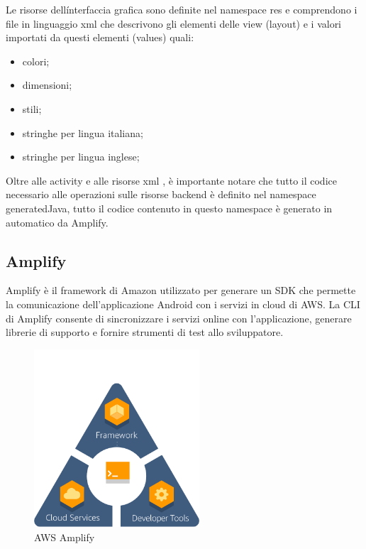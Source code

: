Le risorse dellínterfaccia grafica sono definite nel namespace res e comprendono i file in linguaggio xml che descrivono gli elementi delle view (layout) e i valori importati da questi elementi (values) quali: 
\begin{itemize}
\item colori;
\item dimensioni;
\item stili;
\item stringhe per lingua italiana;
\item stringhe per lingua inglese;
\end{itemize}



Oltre alle activity e alle risorse xml , è importante notare che tutto il codice necessario alle operazioni sulle risorse backend è definito nel namespace generatedJava, tutto il codice contenuto in questo namespace è generato in automatico da Amplify.

\subsection{Amplify}

Amplify è il framework di Amazon utilizzato per generare un SDK che permette la comunicazione dell'applicazione Android con i servizi in cloud di AWS. La CLI di Amplify consente di sincronizzare i servizi online con l'applicazione, generare librerie di supporto e fornire strumenti di test allo sviluppatore.

\begin{figure}[H]
	\begin{center}
		\includegraphics[width=0.55\textwidth, keepaspectratio]{../includes/pics/amplify.png}
		\caption{AWS Amplify}
	\end{center}
\end{figure}

